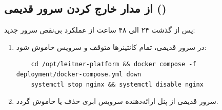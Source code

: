 \documentclass[11pt,a4paper]{article}
\begin{document}
\subsection{از مدار خارج کردن سرور قدیمی ()}
پس از گذشت ۲۴ الی ۴۸ ساعت از عملکرد بی‌نقص سرور جدید:
\begin{enumerate}
    \item در سرور قدیمی، تمام کانتینرها متوقف و سرویس  خاموش شود:
    \begin{latin}
    \small
    \begin{verbatim}
    cd /opt/leitner-platform && docker compose -f deployment/docker-compose.yml down
    systemctl stop nginx && systemctl disable nginx
    \end{verbatim}
    \end{latin}
    \item سرور قدیمی از پنل ارائه‌دهنده سرویس ابری حذف یا خاموش گردد.
\end{enumerate}
\end{document}
